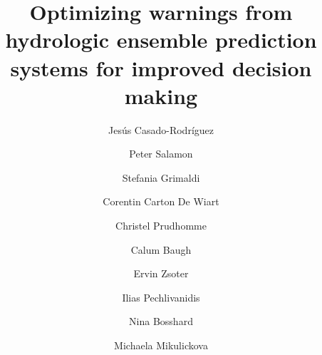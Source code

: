 \documentclass[preprint,12pt,authoryear]{elsarticle}
\begin{document}
\begin{frontmatter}



\title{Optimizing warnings from hydrologic ensemble prediction systems for improved decision making}


\author[inst1]{Jesús Casado-Rodríguez}
\author[inst1]{Peter Salamon}
\author[inst2]{Stefania Grimaldi}
\author[inst2]{Corentin Carton De Wiart}
\author[inst2]{Christel Prudhomme}
\author[inst2]{Calum Baugh}
\author[inst2]{Ervin Zsoter}
\author[inst3]{Ilias Pechlivanidis}
\author[inst3]{Nina Bosshard}
\author[inst4]{Michaela Mikulickova}




\end{frontmatter}
\end{document}
